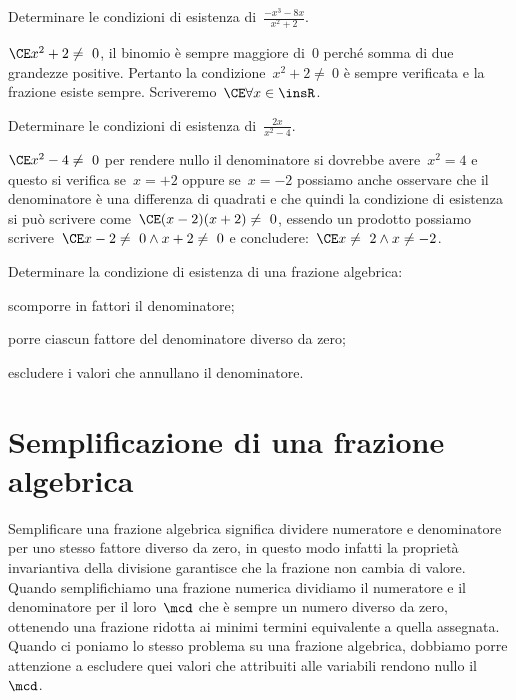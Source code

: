 \begin{esempio}
Determinare le condizioni di esistenza di~$\frac{-x^{3}-8x}{x^{2}+2}$.

$\CE x^{2}+2\neq~0$, il binomio è sempre maggiore di~$0$ perché somma di due 
grandezze positive.
Pertanto la condizione~$x^{2}+2\neq~0$ è sempre verificata e la frazione 
esiste sempre. Scriveremo~$\CE \forall x\in \insR$.
 \end{esempio}

 \begin{esempio}
Determinare le condizioni di esistenza di~$\frac{2x}{x^{2}-4}$.

$\CE x^{2}-4\neq~0$ per rendere nullo il denominatore si dovrebbe 
avere~$x^2 = 4$ e questo si verifica se~$x = +2$
oppure se~$x = -2$ possiamo anche osservare che il denominatore è una 
differenza di quadrati e che quindi la
condizione di esistenza si può scrivere come~$\CE (x-2)(x+2)\neq~0$, essendo 
un prodotto possiamo
scrivere~$\CE x-2\neq~0\wedge x+2\neq~0$ e 
concludere:~$\CE x\neq~2\wedge x\neq -2$.
 \end{esempio}

\begin{procedura}
Determinare la condizione di esistenza di una frazione algebrica:
\begin{enumeratea}
\item scomporre in fattori il denominatore;
\item porre ciascun fattore del denominatore diverso da zero;
\item escludere i valori che annullano il denominatore.
\end{enumeratea}
\end{procedura}


\section{Semplificazione di una frazione algebrica}
\label{sec:frazalg_semplificazione}

Semplificare una frazione algebrica significa dividere numeratore e 
denominatore per uno stesso fattore diverso da zero, in questo modo infatti la 
proprietà invariantiva della divisione garantisce che la frazione non cambia 
di valore.
Quando semplifichiamo una frazione numerica dividiamo il numeratore e il 
denominatore per il loro~$\mcd$
che è sempre un numero diverso da zero, ottenendo una frazione ridotta ai 
minimi termini equivalente a quella assegnata.
Quando ci poniamo lo stesso problema su una frazione algebrica, dobbiamo porre 
attenzione a escludere quei valori che attribuiti alle variabili rendono nullo 
il~$\mcd$.

